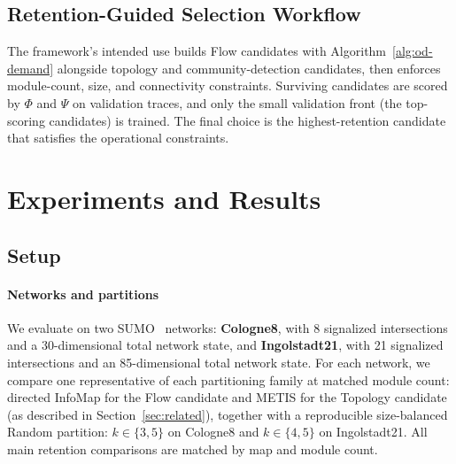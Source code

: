 \documentclass[journal]{IEEEtran}
\theoremstyle{definition}
\begin{document}
\subsection{Retention-Guided Selection Workflow}
\label{sec:workflow}

The framework's intended use builds Flow candidates with Algorithm~\ref{alg:od-demand} alongside topology and community-detection candidates, then enforces module-count, size, and connectivity constraints. Surviving candidates are scored by $\Phi$ and $\Psi$ on validation traces, and only the small validation front (the top-scoring candidates) is trained. The final choice is the highest-retention candidate that satisfies the operational constraints.

\section{Experiments and Results}
\label{sec:experiments}

\subsection{Setup}
\label{sec:setup}

\paragraph{Networks and partitions}
We evaluate on two SUMO~\citep{lopez2018sumo} networks: \textbf{Cologne8}, with 8 signalized intersections and a 30-dimensional total network state, and \textbf{Ingolstadt21}, with 21 signalized intersections and an 85-dimensional total network state. For each network, we compare one representative of each partitioning family at matched module count: directed InfoMap for the Flow candidate and METIS for the Topology candidate (as described in Section~\ref{sec:related}), together with a reproducible size-balanced Random partition: $k\in\{3,5\}$ on Cologne8 and $k\in\{4,5\}$ on Ingolstadt21. All main retention comparisons are matched by map and module count.
\end{document}
